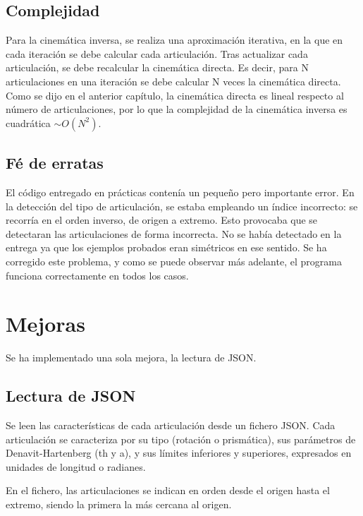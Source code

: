 \subsection{Complejidad}
Para la cinemática inversa, se realiza una aproximación iterativa, en la que en cada iteración se debe calcular cada articulación.
Tras actualizar cada articulación, se debe recalcular la cinemática directa.
Es decir, para N articulaciones en una iteración se debe calcular N veces la cinemática directa. Como se dijo en el anterior capítulo, la cinemática directa es lineal respecto al número de articulaciones, por lo que la complejidad de la cinemática inversa es cuadrática $\sim O(N^2) $.

\subsection{Fé de erratas}
El código entregado en prácticas contenía un pequeño pero importante error. En la detección del tipo de articulación, se estaba empleando un índice incorrecto: se recorría en el orden inverso, de origen a extremo. Esto provocaba que se detectaran las articulaciones de forma incorrecta. No se había detectado en la entrega ya que los ejemplos probados eran simétricos en ese sentido. Se ha corregido este problema, y como se puede observar más adelante, el programa funciona correctamente en todos los casos.


\section{Mejoras}
Se ha implementado una sola mejora, la lectura de JSON.

\subsection{Lectura de JSON}
Se leen las características de cada articulación desde un fichero JSON. Cada articulación se caracteriza por su tipo (rotación o prismática), sus parámetros de Denavit-Hartenberg (th y a),
y sus límites inferiores y superiores, expresados en unidades de longitud o radianes.

En el fichero, las articulaciones se indican en orden desde el origen hasta el extremo, siendo la primera la más cercana al origen.

